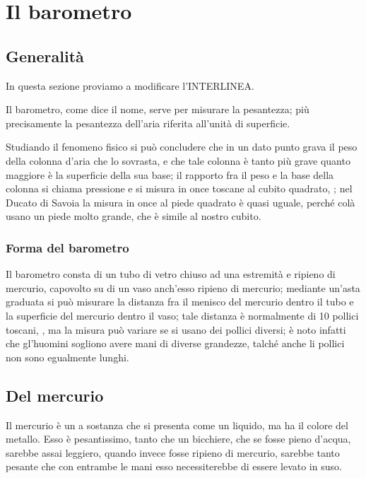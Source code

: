 \documentclass[%
	corpo=11pt,
    twoside,
    stile=classica,
    oldstyle,
    tipotesi=custom,
    greek,
    evenboxes,
]{toptesi}
\begin{document}
{\chapter{Il barometro}
\section{Generalit\`a}
In questa sezione proviamo a modificare l'INTERLINEA.\\

\begin{interlinea}{0.87}
Il barometro, come dice il nome, serve per misurare la pesantezza; pi\`u precisamente la pesantezza dell'aria riferita all'unit\`a di superficie.
\end{interlinea}

\begin{interlinea}{2}
Studiando il fenomeno fisico si pu\`o concludere che in un dato punto grava il peso della colonna d'aria che lo sovrasta, e che tale colonna \`e tanto pi\`u grave quanto maggiore \`e la superficie della sua base; il rapporto fra il peso e la base della colonna si chiama pressione e si misura in once toscane al cubito quadrato, \cite{tor1}; nel Ducato di Savoia la misura in once al piede quadrato \`e quasi uguale, perch\'e col\`a usano un piede molto grande, che \`e simile al nostro cubito.
\end{interlinea}

\subsection{Forma del barometro}
Il barometro consta di un tubo di vetro chiuso ad una estremit\`a e ripieno di mercurio, capovolto su di un vaso anch'esso ripieno di mercurio; mediante un'asta graduata si pu\`o misurare la distanza fra il menisco del mercurio dentro il tubo e la superficie del mercurio dentro il vaso; tale distanza \`e normalmente di 10 pollici toscani, \cite{tor1,tor2}, ma la misura pu\`o variare se si usano dei pollici diversi; \`e noto infatti che gl'huomini sogliono avere mani di diverse grandezze, talch\'e anche li pollici non sono egualmente lunghi.

\section{Del mercurio}
Il mercurio \`e un a sostanza che si presenta come un liquido, ma ha il colore del metallo. Esso \`e pesantissimo, tanto che un bicchiere, che se fosse pieno d'acqua, sarebbe assai leggiero, quando invece fosse ripieno di mercurio, sarebbe tanto pesante che con entrambe le mani esso necessiterebbe di essere levato in suso.


}
\end{document}
